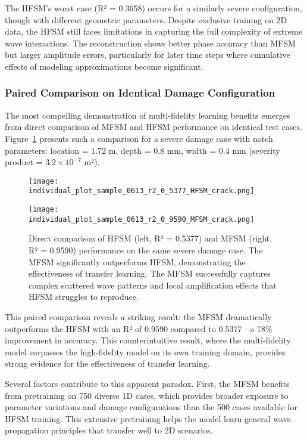 \documentclass[12pt,a4paper]{report}
\begin{document}
The HFSM's worst case (R² = 0.3658) occurs for a similarly severe configuration, though with different geometric parameters. Despite exclusive training on 2D data, the HFSM still faces limitations in capturing the full complexity of extreme wave interactions. The reconstruction shows better phase accuracy than MFSM but larger amplitude errors, particularly for later time steps where cumulative effects of modeling approximations become significant.

\subsubsection{Paired Comparison on Identical Damage Configuration}

The most compelling demonstration of multi-fidelity learning benefits emerges from direct comparison of MFSM and HFSM performance on identical test cases. Figure~\ref{fig:crack_comparison} presents such a comparison for a severe damage case with notch parameters: location = 1.72 m, depth = 0.8 mm, width = 0.4 mm (severity product = $3.2 \times 10^{-7}$ m²).

\begin{figure}[htbp]
\centering
\begin{minipage}{0.49\textwidth}
\centering
\texttt{[image: individual\_plot\_sample\_0613\_r2\_0\_5377\_HFSM\_crack.png]}
\end{minipage}
\hfill
\begin{minipage}{0.49\textwidth}
\centering
\texttt{[image: individual\_plot\_sample\_0613\_r2\_0\_9590\_MFSM\_crack.png]}
\end{minipage}
\caption{Direct comparison of HFSM (left, R² = 0.5377) and MFSM (right, R² = 0.9590) performance on the same severe damage case. The MFSM significantly outperforms HFSM, demonstrating the effectiveness of transfer learning. The MFSM successfully captures complex scattered wave patterns and local amplification effects that HFSM struggles to reproduce.}
\label{fig:crack_comparison}
\end{figure}

This paired comparison reveals a striking result: the MFSM dramatically outperforms the HFSM with an R² of 0.9590 compared to 0.5377—a 78\% improvement in accuracy. This counterintuitive result, where the multi-fidelity model surpasses the high-fidelity model on its own training domain, provides strong evidence for the effectiveness of transfer learning.

Several factors contribute to this apparent paradox. First, the MFSM benefits from pretraining on 750 diverse 1D cases, which provides broader exposure to parameter variations and damage configurations than the 500 cases available for HFSM training. This extensive pretraining helps the model learn general wave propagation principles that transfer well to 2D scenarios.
\end{document}
